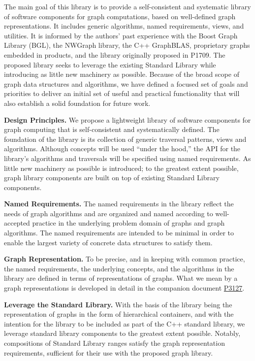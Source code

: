 The main goal of this library is to provide a self-consistent and systematic library of software components for
graph computations, based on well-defined graph representations. It includes generic 
algorithms, named requirements, views, and utilities.  
%
It is informed by the authors' past experience with the Boost Graph Library (BGL), the NWGraph library, the C++
GraphBLAS, proprietary graphs embedded in products, and the library originally proposed in P1709.  The proposed
library seeks to leverage the existing Standard Library while introducing as little new machinery as possible.
%
Because of the broad scope of graph data structures and algorithms, we have defined a focused set of goals and
priorities to deliver an initial set of useful and practical functionality that will also establish a solid
foundation for future work.


\textbf{Design Principles.}  We propose a lightweight library of software components for graph computing that is
self-consistent and systematically defined.  The foundation of the library is its collection of generic traversal
patterns, views and algorithms.  Although concepts will be used ``under the hood,'' the API for the library's
algorithms and traversals will be specified using named requirements.  As little new machinery as possible is
introduced; to the greatest extent possible, graph library components are built on top of existing Standard
Library components.

\textbf{Named Requirements.}  The named requirements in the library reflect the needs of graph algorithms and
are organized and named according to well-accepted practice in the underlying problem domain of graphs and graph
algorithms.  The named requirements are intended to be minimal in order to enable the largest variety of
concrete data structures to satisfy them.

\textbf{Graph Representation.}  To be precise, and in keeping with common practice, the named requirements, the
underlying concepts, and the algorithms in the library are defined in terms of representations of graphs.  
What we mean by a graph representations is developed in detail in the companion document \href{https://www.wg21.link/P3127}{P3127}.

\textbf{Leverage the Standard Library.}
With the basis of the library being the representation of graphs in the form of hierarchical containers, and
with the intention for the library to be included as part of the C++ standard library, we leverage standard
library components to the greatest extent possible.  Notably, compositions of Standard Library ranges
satisfy the graph representation requirements, sufficient for their use with the proposed graph library.


